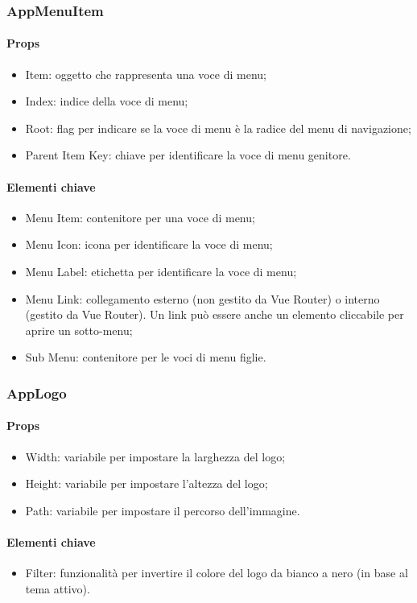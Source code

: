 \subsubsection{AppMenuItem}

\paragraph*{Props}
\begin{itemize}
  \item Item: oggetto che rappresenta una voce di menu;
  \item Index: indice della voce di menu;
  \item Root: flag per indicare se la voce di menu è la radice del menu di navigazione;
  \item Parent Item Key: chiave per identificare la voce di menu genitore.
\end{itemize}

\paragraph*{Elementi chiave}
\begin{itemize}
  \item Menu Item: contenitore per una voce di menu;
  \item Menu Icon: icona per identificare la voce di menu;
  \item Menu Label: etichetta per identificare la voce di menu;
  \item Menu Link: collegamento esterno (non gestito da Vue Router) o interno (gestito da Vue Router). Un link può essere anche un elemento cliccabile per aprire un sotto-menu;
  \item Sub Menu: contenitore per le voci di menu figlie.
\end{itemize}

\subsubsection{AppLogo}

\paragraph*{Props}
\begin{itemize}
  \item Width: variabile per impostare la larghezza del logo;
  \item Height: variabile per impostare l'altezza del logo;
  \item Path: variabile per impostare il percorso dell'immagine.
\end{itemize}

\paragraph*{Elementi chiave}
\begin{itemize}
  \item Filter: funzionalità per invertire il colore del logo da bianco a nero (in base al tema attivo).
\end{itemize}